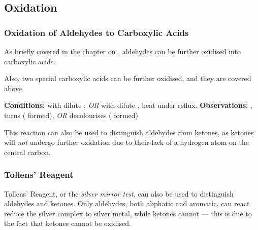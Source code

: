 

		\subsection{Oxidation}

			\subsubsection{Oxidation of Aldehydes to Carboxylic Acids}

				As briefly covered in the chapter on \hyperlink{CompleteOxidationOfPrimaryAlcohols}{}, aldehydes can be
				further oxidised into carboxylic acids.

				Also, two special carboxylic acids can be further oxidised, and they are covered above.

				\vspace{1.5em}
				\vbox{\textbf{Conditions:}	\tabto{35mm} with dilute , \textit{OR}  with dilute ,
											\tabto{35mm}heat under reflux.}
				\vspace{0.75em}
				\vbox{\textbf{Observations:}\tabto{35mm} , turns 
														( formed), \textit{OR}
											\tabto{35mm}  decolourises ( formed)}


				This reaction can also be used to distinguish aldehydes from ketones, as ketones will \textit{not} undergo further oxidation
				due to their lack of a hydrogen atom on the central carbon.


			\subsubsection{Tollens' Reagent}

				Tollens' Reagent, or the \textit{silver mirror test}, can also be used to distinguish aldehydes and ketones. Only aldehydes,
				both aliphatic and aromatic, can react reduce the silver complex to silver metal, while ketones cannot –– this is due to the
				fact that ketones cannot be oxidised.

